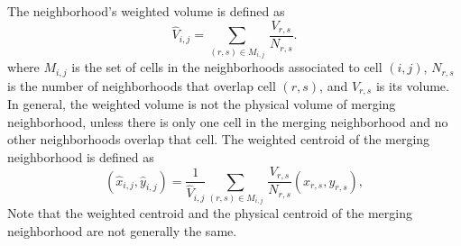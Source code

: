 The neighborhood's weighted volume is defined as
\begin{equation}
\label{voldef}
{\widehat V}_{i,j} =  \sum_{(r,s) \in M_{i,j} } \,  \frac{V_{r,s}}{N_{r,s}}.
\end{equation}
where $M_{i,j}$ is the set of cells in the neighborhoods associated to cell $(i,j)$, $N_{r,s}$ is the number of neighborhoods that overlap cell $(r,s)$, and $V_{r,s}$ is its volume.
In general, the weighted volume is not the physical volume of merging neighborhood, unless there is only one cell in the merging neighborhood and no other neighborhoods overlap that cell.  
The weighted centroid of the merging neighborhood is defined as
\begin{equation}
\label{centroiddef}
({\widehat x}_{i,j},{\widehat y}_{i,j}) = \frac{1}{\widehat V_{i,j}} \sum_{(r,s) \in M_{i,j} } \,  \frac{V_{r,s}}{N_{r,s}}(x_{r,s},y_{r,s}),
\end{equation}
Note that the weighted centroid and the physical centroid of the merging neighborhood are not generally the same.








